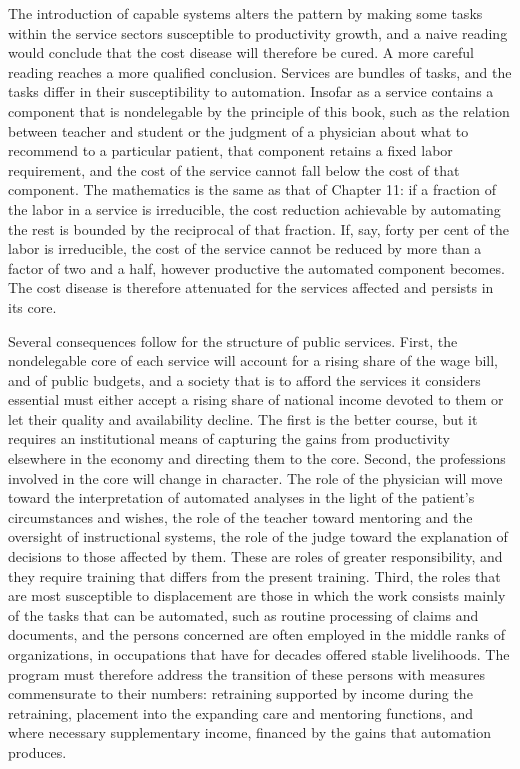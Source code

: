 The introduction of capable systems alters the pattern by making some tasks within the service sectors susceptible to productivity growth, and a naive reading would conclude that the cost disease will therefore be cured. A more careful reading reaches a more qualified conclusion. Services are bundles of tasks, and the tasks differ in their susceptibility to automation. Insofar as a service contains a component that is nondelegable by the principle of this book, such as the relation between teacher and student or the judgment of a physician about what to recommend to a particular patient, that component retains a fixed labor requirement, and the cost of the service cannot fall below the cost of that component. The mathematics is the same as that of Chapter 11: if a fraction of the labor in a service is irreducible, the cost reduction achievable by automating the rest is bounded by the reciprocal of that fraction. If, say, forty per cent of the labor is irreducible, the cost of the service cannot be reduced by more than a factor of two and a half, however productive the automated component becomes. The cost disease is therefore attenuated for the services affected and persists in its core.

Several consequences follow for the structure of public services. First, the nondelegable core of each service will account for a rising share of the wage bill, and of public budgets, and a society that is to afford the services it considers essential must either accept a rising share of national income devoted to them or let their quality and availability decline. The first is the better course, but it requires an institutional means of capturing the gains from productivity elsewhere in the economy and directing them to the core. Second, the professions involved in the core will change in character. The role of the physician will move toward the interpretation of automated analyses in the light of the patient's circumstances and wishes, the role of the teacher toward mentoring and the oversight of instructional systems, the role of the judge toward the explanation of decisions to those affected by them. These are roles of greater responsibility, and they require training that differs from the present training. Third, the roles that are most susceptible to displacement are those in which the work consists mainly of the tasks that can be automated, such as routine processing of claims and documents, and the persons concerned are often employed in the middle ranks of organizations, in occupations that have for decades offered stable livelihoods. The program must therefore address the transition of these persons with measures commensurate to their numbers: retraining supported by income during the retraining, placement into the expanding care and mentoring functions, and where necessary supplementary income, financed by the gains that automation produces.

